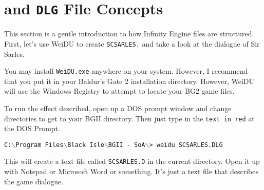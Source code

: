 \documentclass{article}
\def\ttref#1{\ahrefloc{#1}{\tt #1}}
\def\DEFINE#1{{\tt \bf #1}\label{#1}\index{#1}}
\def\t#1{{\tt #1}}
\def\CMD#1{{\tt {C:$\backslash$Program Files$\backslash$Black Isle$\backslash$BGII - SoA$\backslash$>} \color{red} \t{#1} }}
\begin{document}
\section{\ttref{D} and \DEFINE{DLG} File Concepts}

This section is a gentle introduction to how Infinity Engine \ttref{DLG}
files are structured. First, let's use WeiDU to create
\t{SCSARLES.}\ttref{D} and take a look at the dialogue of Sir Sarles. 

You may install \t{WeiDU.exe} anywhere on your system. However, I recommend
that you put it in your Baldur's Gate 2 installation directory.  However,
WeiDU will use the Windows Registry to attempt to locate your BG2 game
files. 

To run the effect described, open up a DOS prompt window and change
directories to get to your BGII directory. Then just type in the
{\color{red} \tt text in red} at the DOS Prompt. 

\CMD{weidu SCSARLES.DLG} 

This will create a text file called \t{SCSARLES.D} in the current
directory.  Open it up with Notepad or Microsoft Word or something. It's
just a text file that describes the game dialogue.
\end{document}
